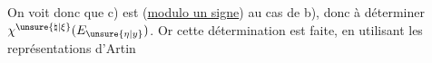On voit donc que c) est  (\uline{modulo un signe}) au cas de b), donc à déterminer $\chi^{\unsure{\natural|\xi}}(E_{\unsure{\eta|y}})$. Or cette détermination est faite, en utilisant les représentations d'Artin 

